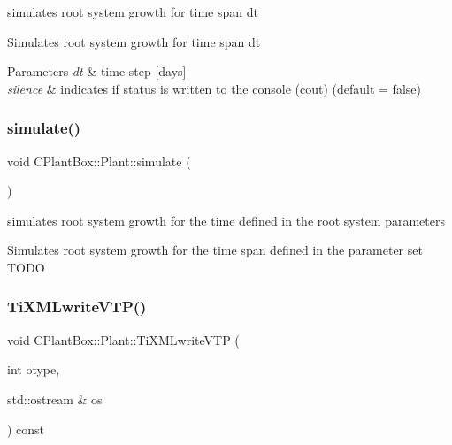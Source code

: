 simulates root system growth for time span dt 

Simulates root system growth for time span dt


\begin{DoxyParams}{Parameters}
{\em dt} & time step \mbox{[}days\mbox{]} \\
\hline
{\em silence} & indicates if status is written to the console (cout) (default = false) \\
\hline
\end{DoxyParams}
\mbox{\label{classCPlantBox_1_1Plant_a7761e055500ddc7f6444af0958deb1c6}} 
\subsubsection{\texorpdfstring{simulate()}{simulate()}\hspace{0.1cm}{\footnotesize\ttfamily [2/2]}}
{\footnotesize\ttfamily void C\+Plant\+Box\+::\+Plant\+::simulate (\begin{DoxyParamCaption}{ }\end{DoxyParamCaption})}



simulates root system growth for the time defined in the root system parameters 

Simulates root system growth for the time span defined in the parameter set T\+O\+DO \mbox{\label{classCPlantBox_1_1Plant_a5843463140b144b5e5a08d705c521efb}} 
\subsubsection{\texorpdfstring{Ti\+X\+M\+Lwrite\+V\+T\+P()}{TiXMLwriteVTP()}}
{\footnotesize\ttfamily void C\+Plant\+Box\+::\+Plant\+::\+Ti\+X\+M\+Lwrite\+V\+TP (\begin{DoxyParamCaption}\item[{int}]{otype,  }\item[{std\+::ostream \&}]{os }\end{DoxyParamCaption}) const}



